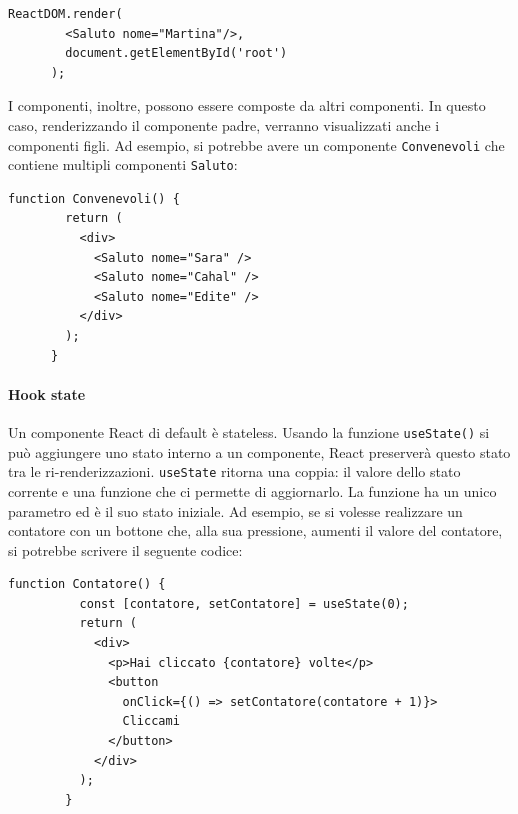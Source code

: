 \documentclass[a4paper]{article}
\begin{document}
    \begin{lstlisting}[style=ES6, title={Esempio composizione di componenti}]
      ReactDOM.render(
        <Saluto nome="Martina"/>, 
        document.getElementById('root')
      );\end{lstlisting}
    
    I componenti, inoltre, possono essere composte da altri componenti. In questo caso,
    renderizzando il componente padre, verranno visualizzati anche i componenti figli. Ad esempio, 
    si potrebbe avere un componente \verb|Convenevoli| che contiene multipli componenti \verb|Saluto|:
    \begin{lstlisting}[style=ES6, title={Esempio renderizzazione componente}]
      function Convenevoli() {
        return (
          <div>
            <Saluto nome="Sara" />
            <Saluto nome="Cahal" />
            <Saluto nome="Edite" />
          </div>
        );
      }\end{lstlisting}

      \paragraph{Hook state}
      Un componente React di default è stateless. Usando la funzione \verb|useState()| si può
      aggiungere uno stato interno a un componente, React preserverà questo stato tra le ri-renderizzazioni.
      \verb|useState| ritorna una coppia: il valore dello stato corrente e una funzione che ci permette di aggiornarlo.
      La funzione ha un unico parametro ed è il suo stato iniziale. Ad esempio, se si volesse realizzare un contatore con un bottone che, alla sua pressione,
      aumenti il valore del contatore, si potrebbe scrivere il seguente codice:
      \begin{lstlisting}[style=ES6, title={Esempio contatore con stato interno}]
        function Contatore() {
          const [contatore, setContatore] = useState(0);
          return (
            <div>
              <p>Hai cliccato {contatore} volte</p>
              <button 
                onClick={() => setContatore(contatore + 1)}>
                Cliccami
              </button>
            </div>
          );
        }\end{lstlisting}
\end{document}
